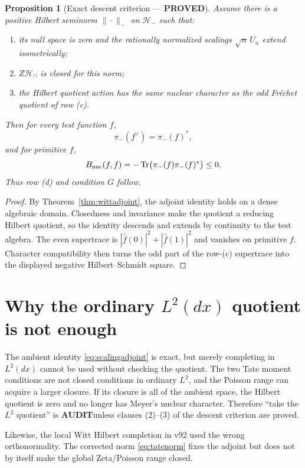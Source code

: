 \documentclass[11pt]{article}
\newcommand{\PROVED}{\textcolor{green!40!black}{\textbf{PROVED}}}
\newcommand{\AUDIT}{\textcolor{orange!70!black}{\textbf{AUDIT}}}
\newtheorem{proposition}{Proposition}
\begin{document}
\begin{proposition}[Exact descent criterion --- \PROVED]
Assume there is a positive Hilbert seminorm $\|\cdot\|_-$ on $\mathcal H_-$
such that:
\begin{enumerate}
\item its null space is zero and the rationally normalized scalings
      $\sqrt n\,U_n$ extend isometrically;
\item $Z\mathcal H_\cap$ is closed for this norm;
\item the Hilbert quotient action has the same nuclear character as the odd
      Fr\'echet quotient of row (c).
\end{enumerate}
Then for every test function $f$,
\[
 \pi_-(f^\vee)=\pi_-(f)^*,
\]
and for primitive $f$,
\[
 B_{\rm nuc}(f,f)
 =-\operatorname{Tr}\bigl(\pi_-(f)\pi_-(f)^*\bigr)\leq0.
\]
Thus row (d) and condition $G$ follow.
\end{proposition}

\begin{proof}
By Theorem~\ref{thm:wittadjoint}, the adjoint identity holds on a dense
algebraic domain.  Closedness and invariance make the quotient a reducing
Hilbert quotient, so the identity descends and extends by continuity to the
test algebra.  The even supertrace is
$|\widehat f(0)|^2+|\widehat f(1)|^2$ and vanishes on primitive $f$.
Character compatibility then turns the odd part of the row-(c) supertrace
into the displayed negative Hilbert--Schmidt square.
\end{proof}

\section{Why the ordinary $L^2(dx)$ quotient is not enough}

The ambient identity \eqref{eq:scalingadjoint} is exact, but merely completing
in $L^2(dx)$ cannot be used without checking the quotient.  The two Tate
moment conditions are not closed conditions in ordinary $L^2$, and the
Poisson range can acquire a larger closure.  If its closure is all of the
ambient space, the Hilbert quotient is zero and no longer has Meyer's nuclear
character.  Therefore ``take the $L^2$ quotient'' is \AUDIT unless clauses
(2)--(3) of the descent criterion are proved.

Likewise, the local Witt Hilbert completion in v92 used the wrong
orthonormality.  The corrected norm \eqref{eq:tatenorm} fixes the adjoint but
does not by itself make the global Zeta/Poisson range closed.
\end{document}
